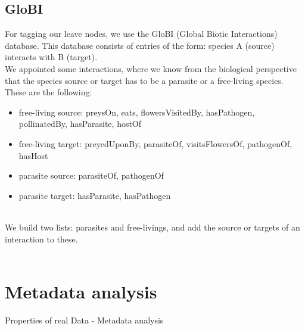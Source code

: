     \subsection{GloBI}
      For tagging our leave nodes, we use the GloBI (Global Biotic Interactions) database. This database 
        consists of entries of the form: species A (source) interacts with B (target). \\
      We appointed some interactions, where we know from the biological perspective that the species 
      source or target has to be a parasite or a free-living species. These are the following:
      \begin{itemize}
        \item free-living source: preysOn, eats, flowersVisitedBy, hasPathogen, pollinatedBy, 
          hasParasite, hostOf
        \item free-living target: preyedUponBy, parasiteOf, visitsFlowersOf, pathogenOf, hasHost
        \item parasite source: parasiteOf, pathogenOf
        \item parasite target: hasParasite, hasPathogen
      \end{itemize}
       \\
      We build two lists: parasites and free-livings, and add the source or targets of an interaction
        to these. \\
       \\

  \section{Metadata analysis}
    Properties of real Data - Metadata analysis \\

